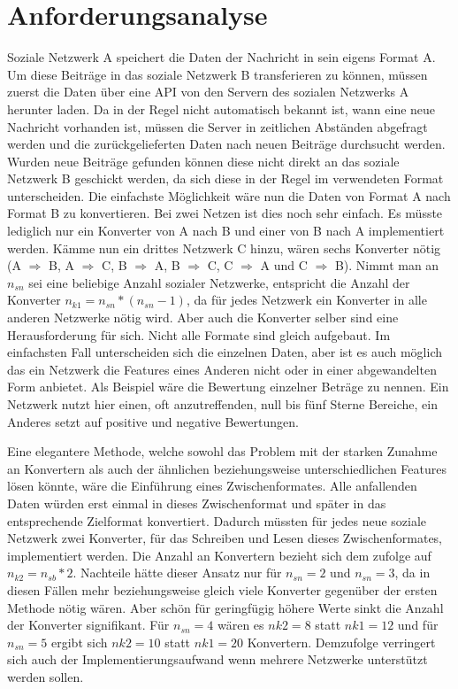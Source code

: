 
\chapter{Anforderungsanalyse} %
\label{cha:anforderungsanalyse}


Soziale Netzwerk A speichert die Daten der Nachricht in sein eigens Format A. Um diese Beiträge in das soziale Netzwerk B transferieren zu können, müssen zuerst die Daten über eine API von den Servern des sozialen Netzwerks A herunter laden. Da in der Regel nicht automatisch bekannt ist, wann eine neue Nachricht vorhanden ist, müssen die Server in zeitlichen Abständen abgefragt werden und die zurückgelieferten Daten nach neuen Beiträge durchsucht werden. Wurden neue Beiträge gefunden können diese nicht direkt an das soziale Netzwerk B geschickt werden, da sich diese in der Regel im verwendeten Format unterscheiden. Die einfachste Möglichkeit wäre nun die Daten von Format A nach Format B zu konvertieren. Bei zwei Netzen ist dies noch sehr einfach. Es müsste lediglich nur ein Konverter von A nach B und einer von B nach A implementiert werden. Kämme nun ein drittes Netzwerk C hinzu, wären sechs Konverter nötig (A $\Rightarrow$ B, A $\Rightarrow$ C, B $\Rightarrow$ A, B $\Rightarrow$ C, C $\Rightarrow$ A und C $\Rightarrow$ B). Nimmt man an $n_{sn}$ sei eine beliebige Anzahl sozialer Netzwerke, entspricht die Anzahl der Konverter $n_{k1}= n_{sn}*(n_{sn}-1)$, da für jedes Netzwerk ein Konverter in alle anderen Netzwerke nötig wird. Aber auch die Konverter selber sind eine Herausforderung für sich. Nicht alle Formate sind gleich aufgebaut. Im einfachsten Fall unterscheiden sich die einzelnen Daten, aber ist es auch möglich das ein Netzwerk die Features eines Anderen nicht oder in einer abgewandelten Form anbietet. Als Beispiel wäre die Bewertung einzelner Beträge zu nennen. Ein Netzwerk nutzt hier einen, oft anzutreffenden, null bis fünf Sterne Bereiche, ein Anderes setzt auf positive und negative Bewertungen.

\medskip

Eine elegantere Methode, welche sowohl das Problem mit der starken Zunahme an Konvertern als auch der ähnlichen beziehungsweise unterschiedlichen Features lösen könnte, wäre die Einführung eines Zwischenformates. Alle anfallenden Daten würden erst einmal in dieses Zwischenformat und später in das entsprechende Zielformat konvertiert. Dadurch müssten für jedes neue soziale Netzwerk zwei Konverter, für das Schreiben und Lesen dieses Zwischenformates, implementiert werden. Die Anzahl an Konvertern bezieht sich dem zufolge auf $n_{k2} = n_{sb} * 2$. Nachteile hätte dieser Ansatz nur für $n_{sn}=2$ und $n_{sn}=3$, da in diesen Fällen mehr beziehungsweise gleich viele Konverter gegenüber der ersten Methode nötig wären. Aber schön für geringfügig höhere Werte sinkt die Anzahl der Konverter signifikant. Für $n_{sn} = 4$ wären es $n{k2} = 8$ statt $n{k1} = 12$ und für $n_{sn} = 5$ ergibt sich $n{k2} = 10$ statt $n{k1} = 20$ Konvertern. Demzufolge verringert sich auch der Implementierungsaufwand wenn mehrere Netzwerke unterstützt werden sollen.

